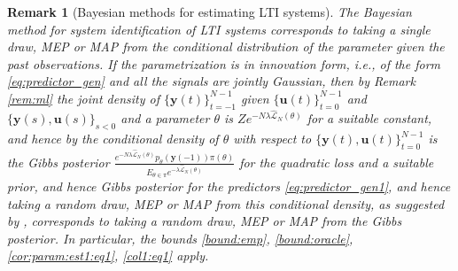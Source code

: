 \documentclass{article}
\def\rvu{{\mathbf{i}}}
\def\rvu{{\mathbf{u}}}
\newtheorem{remark}[theorem]{Remark}
\newcommand{\y}{\mathbf{y}}
\begin{document}
 \begin{remark}[Bayesian methods for estimating LTI systems]
  \label{rem:bayesian}
    The Bayesian method for system identification of LTI systems \cite{NINNESS201040} corresponds to taking a single draw, MEP or MAP from the conditional distribution of the parameter given the past observations. If the parametrization is in innovation form, i.e., of the form \eqref{eq:predictor_gen} and all the signals are jointly Gaussian,  then by
    Remark \ref{rem:ml}
    the joint density of  $\{\y(t)\}_{t=-1}^{N-1}$ given 
    $\{\rvu(t)\}_{t=0}^{N-1}$ and 
    $\{\y(s),\rvu(s)\}_{s < 0}$ and a parameter 
    $\theta$ is $Ze^{-N\lambda \hat{\mathcal{L}}_N(\theta)}$ for a suitable constant, 
    and hence by \cite[Section 3, eq. (12)]{NINNESS201040}
    the conditional density of $\theta$ with respect to
    $\{\y(t),\rvu(t)\}_{t=0}^{N-1}$ is
    the Gibbs posterior 
    $\frac{e^{-N\lambda \hat{\mathcal{L}}_N(\theta)}p_{\theta}(\y(-1))\pi(\theta)}{E_{\theta \in \pi} e^{-\lambda \hat{\mathcal{L}}_N(\theta)}}$ for the quadratic loss and a suitable prior, 
    and hence 
    Gibbs posterior for the predictors \eqref{eq:predictor_gen1}, and hence taking a random draw, MEP or MAP from 
    this conditional density, as suggested by \cite{NINNESS201040}, corresponds to taking a random draw, MEP or MAP from
    the Gibbs posterior. In particular, the bounds  \eqref{bound:emp}, \eqref{bound:oracle}, \eqref{cor:param:est1:eq1}, \eqref{col1:eq1} apply.
 \end{remark}
\end{document}

